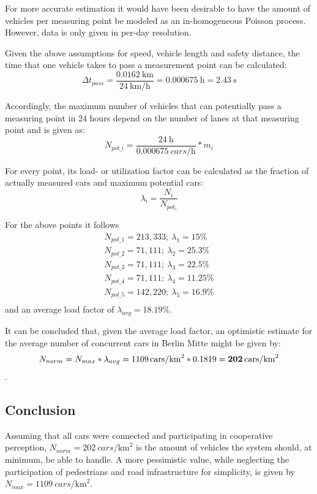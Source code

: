 For more accurate estimation it would have been desirable to have the amount of vehicles per measuring point be modeled as an in-homogeneous Poisson process. However, data is only given in per-day resolution. 

Given the above assumptions for speed, vehicle length and safety distance, the time that one vehicle takes to pass a measurement point can be calculated: $$\Delta t_{pass} = \frac{\SI{0.0162}{\km}}{\SI{24}{\km\per\hour}} = \SI{0.000675}{\hour} = \SI{2.43}{\second}$$

Accordingly, the maximum number of vehicles that can potentially pass a measuring point in 24 hours depend on the number of lanes at that measuring point and is given as: $$N_{pot\_i} = \frac{\SI{24}{\hour}}{\SI{0.000675}{cars\per\hour}} * m_i$$

For every point, its load- or utilization factor can be calculated as the fraction of actually measured cars and maximum potential cars: $$\lambda_i = \frac{N_i}{N_{pot_i}}$$

For the above points it follows
\begin{gather*}
N_{pot\_1} = 213,333; \  \lambda_1 = 15 \% \\
N_{pot\_2} = 71,111; \  \lambda_2 = 25.3 \% \\
N_{pot\_3} = 71,111; \  \lambda_3 = 22.5 \% \\
N_{pot\_4} = 71,111; \  \lambda_4 = 11.25 \% \\
N_{pot\_5} = 142,220; \  \lambda_5 = 16.9 \% \\
\end{gather*}
and an average load factor of $\lambda_{avg} = 18.19 \%$.

It can be concluded that, given the average load factor, an optimistic estimate for the average number of concurrent cars in Berlin Mitte might be given by: $$N_{norm} = N_{max} * \lambda_{avg} = \SI[detect-weight]{1109}{cars\per\square\km} * 0.1819 = \textbf{\SI[detect-weight]{202}{cars\per\square\km}}$$.

\subsection{Conclusion}
\label{subsec:problem_analysis:conclusion}
Assuming that all cars were connected and participating in cooperative perception, \textbf{$N_{norm} = \SI[detect-weight]{202}{cars\per\square\km}$} is the amount of vehicles the system should, at minimum, be able to handle. A more pessimistic value, while neglecting the participation of pedestrians and road infrastructure for simplicity, is given by \textbf{$N_{max} = \SI[detect-weight]{1109}{cars\per\square\km}$}.

